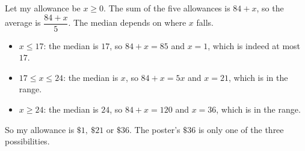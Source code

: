 Let my allowance be $x\ge0$. The sum of the five allowances is $84+x$, so the average is $\dfrac{84+x}{5}$. The median depends on where $x$ falls.
\begin{itemize}
\item $x\le17$: the median is $17$, so $84+x=85$ and $x=1$, which is indeed at most $17$.
\item $17\le x\le24$: the median is $x$, so $84+x=5x$ and $x=21$, which is in the range.
\item $x\ge24$: the median is $24$, so $84+x=120$ and $x=36$, which is in the range.
\end{itemize}
So my allowance is $\boxed{\$1,\ \$21\text{ or }\$36}$. The poster's $\$36$ is only one of the three possibilities.

